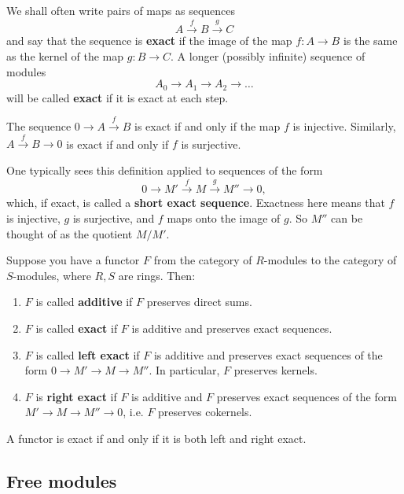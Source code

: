 We shall often write pairs of maps as sequences
\[ A \stackrel{f}{\to} B \stackrel{g}{\to} C  \]
and say that the sequence is \textbf{exact} if the image of the map $f:A
\to B$ is the same as the kernel of the map $g: B \to C$.
A longer (possibly infinite) sequence of modules
\[ A_0 \to A_1 \to A_2 \to \dots  \]
will be called \textbf{exact} if it is exact at each step.

\begin{example} 
The sequence $0 \to A \stackrel{f}{\to} B$ is exact if and only if the map $f$
is injective. Similarly, $A \stackrel{f}{\to} B \to 0$ is exact if and only if
$f$ is surjective. 
\end{example} 

One typically sees this definition applied to sequences of the form
\[ 0 \to M'\stackrel{f}{ \to} M \stackrel{g}{\to} M'' \to 0,  \]
which, if exact, is called a \textbf{short exact sequence}. 
Exactness here means that $f$ is injective, $g$ is surjective, and $f$ maps
onto the image of $g$.  So $M''$ can be thought of as the quotient $M/M'$.

Suppose you have a functor  $F$ from the category of $R$-modules to the
category of  $S$-modules, where $R, S$ are rings.  Then:

\begin{definition} 
\begin{enumerate}
\item  $F$ is called \textbf{additive} if $F$ preserves direct sums.  
\item  $F$ is called \textbf{exact} if $F$ is additive and preserves exact sequences.  
\item  $F$ is called \textbf{left exact} if $F$ is additive and preserves exact sequences of the form
$0 \to M' \to M \to M''$.  In particular, $F$ preserves kernels.  
\item  $F$ is \textbf{right exact} if $F$ is additive and $F$ preserves exact
sequences of the form $M' \to M \to M'' \to 0$, i.e. $F$ preserves cokernels.  
\end{enumerate}
\end{definition} 

A functor is exact if and only if it is both left and right exact.  



\subsection{Free modules}

